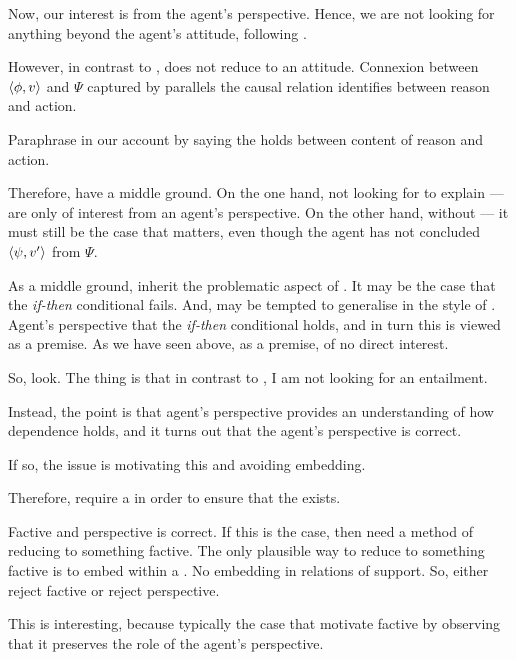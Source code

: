 \begin{note}
  Now, our interest is from the agent's perspective.
  Hence, we are not looking for anything beyond the agent's attitude, following \citeauthor{Davidson:1963aa}.

  However, in contrast to \citeauthor{Davidson:1963aa}, \ros{} does not reduce to an attitude.
  Connexion between \(\langle \phi, v \rangle\) and \(\Psi\) captured by \ros{} parallels the causal relation \citeauthor{Davidson:1963aa} identifies between reason and action.

  Paraphrase \citeauthor{Davidson:1963aa} in our account by saying the \ros{} holds between content of reason and action.

  Therefore, have a middle ground.
  On the one hand, not looking for  to explain ---  are only of interest from an agent's perspective.
  On the other hand, \ros{} without \witness{} --- it must still be the case that \ros{} matters, even though the agent has not concluded \(\langle \psi, v' \rangle\) from \(\Psi\).
\end{note}

\begin{note}
  As a middle ground, inherit the problematic aspect of \citeauthor{Dancy:2000aa}.
  It may be the case that the \emph{if-then} conditional fails.
  And, may be tempted to generalise in the style of \citeauthor{Davidson:1963aa}.
  Agent's perspective that the \emph{if-then} conditional holds, and in turn this is viewed as a premise.
  As we have seen above, as a premise, of no direct interest.
\end{note}

\begin{note}
  So, look.
  The thing is that in contrast to \citeauthor{Dancy:2000aa}, I am not looking for an entailment.

  Instead, the point is that agent's perspective provides an understanding of how dependence holds, and it turns out that the agent's perspective is correct.

  If so, the issue is motivating this and avoiding embedding.
\end{note}

\begin{note}
  Therefore, require a \witness{} in order to ensure that the \ros{} exists.
\end{note}

\begin{note}
  Factive and perspective is correct.
  If this is the case, then need a method of reducing to something factive.
  The only plausible way to reduce to something factive is to embed within a \ros{}.
  No embedding in relations of support.
  So, either reject factive or reject perspective.

  This is interesting, because typically the case that motivate factive by observing that it preserves the role of the agent's perspective.
\end{note}

